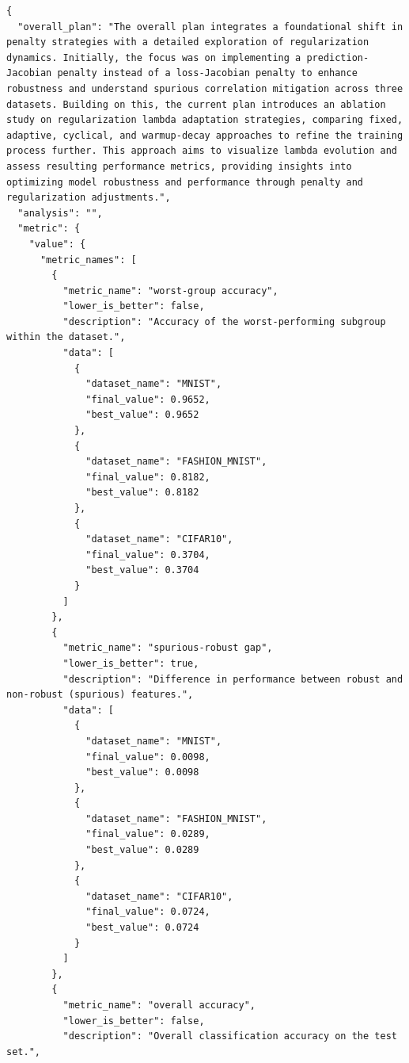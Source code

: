 \begin{appendices}
\begin{tcolorbox}[breakable, colback=orange!5!white, colframe=orange!80!black, title=Example Stage 4 summary]
\begin{Verbatim}[breaklines, breakafter={/,_,-,.}, breaksymbol={}, breaksymbolleft={}, fontsize=\small]
{
  "overall_plan": "The overall plan integrates a foundational shift in penalty strategies with a detailed exploration of regularization dynamics. Initially, the focus was on implementing a prediction-Jacobian penalty instead of a loss-Jacobian penalty to enhance robustness and understand spurious correlation mitigation across three datasets. Building on this, the current plan introduces an ablation study on regularization lambda adaptation strategies, comparing fixed, adaptive, cyclical, and warmup-decay approaches to refine the training process further. This approach aims to visualize lambda evolution and assess resulting performance metrics, providing insights into optimizing model robustness and performance through penalty and regularization adjustments.",
  "analysis": "",
  "metric": {
    "value": {
      "metric_names": [
        {
          "metric_name": "worst-group accuracy",
          "lower_is_better": false,
          "description": "Accuracy of the worst-performing subgroup within the dataset.",
          "data": [
            {
              "dataset_name": "MNIST",
              "final_value": 0.9652,
              "best_value": 0.9652
            },
            {
              "dataset_name": "FASHION_MNIST",
              "final_value": 0.8182,
              "best_value": 0.8182
            },
            {
              "dataset_name": "CIFAR10",
              "final_value": 0.3704,
              "best_value": 0.3704
            }
          ]
        },
        {
          "metric_name": "spurious-robust gap",
          "lower_is_better": true,
          "description": "Difference in performance between robust and non-robust (spurious) features.",
          "data": [
            {
              "dataset_name": "MNIST",
              "final_value": 0.0098,
              "best_value": 0.0098
            },
            {
              "dataset_name": "FASHION_MNIST",
              "final_value": 0.0289,
              "best_value": 0.0289
            },
            {
              "dataset_name": "CIFAR10",
              "final_value": 0.0724,
              "best_value": 0.0724
            }
          ]
        },
        {
          "metric_name": "overall accuracy",
          "lower_is_better": false,
          "description": "Overall classification accuracy on the test set.",

\end{Verbatim}
\end{tcolorbox}
\end{appendices}
